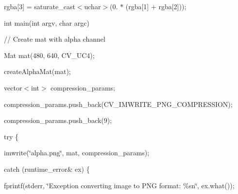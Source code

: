 {\ttfamily }

{\ttfamily }

{\ttfamily rgba\mbox{[}3\mbox{]} = saturate\+\_\+cast$<$uchar$>$(0. $\ast$ (rgba\mbox{[}1\mbox{]} + rgba\mbox{[}2\mbox{]}));}

{\ttfamily }

{\ttfamily }

{\ttfamily int main(int argv, char argc)}

{\ttfamily }

{\ttfamily }

{\ttfamily // Create mat with alpha channel}

{\ttfamily }

{\ttfamily }

{\ttfamily Mat mat(480, 640, C\+V\+\_\+U\+C4);}

{\ttfamily }

{\ttfamily }

{\ttfamily create\+Alpha\+Mat(mat);}

{\ttfamily }

{\ttfamily }

{\ttfamily vector$<$int$>$ compression\+\_\+params;}

{\ttfamily }

{\ttfamily }

{\ttfamily compression\+\_\+params.\+push\+\_\+back(\+C\+V\+\_\+\+I\+M\+W\+R\+I\+T\+E\+\_\+\+P\+N\+G\+\_\+\+C\+O\+M\+P\+R\+E\+S\+S\+I\+O\+N);}

{\ttfamily }

{\ttfamily }

{\ttfamily compression\+\_\+params.\+push\+\_\+back(9);}

{\ttfamily }

{\ttfamily }

{\ttfamily try \{}

{\ttfamily }

{\ttfamily }

{\ttfamily imwrite(\char`\"{}alpha.\+png\char`\"{}, mat, compression\+\_\+params);}

{\ttfamily }

{\ttfamily }

{\ttfamily catch (runtime\+\_\+error\& ex) \{}

{\ttfamily }

{\ttfamily }

{\ttfamily fprintf(stderr, \char`\"{}\+Exception converting image to P\+N\+G format\+: \%sn\char`\"{}, ex.\+what());}


